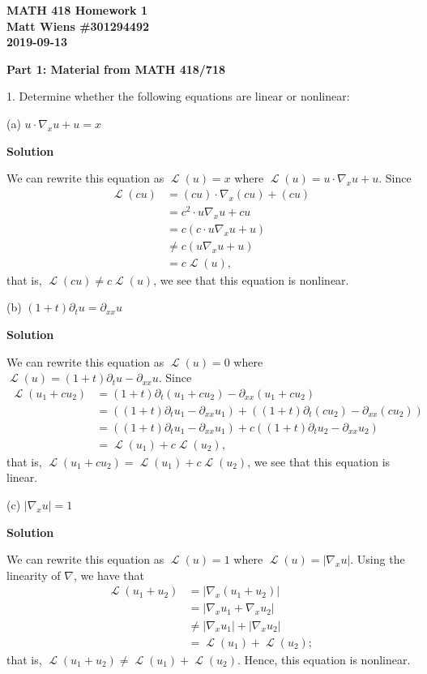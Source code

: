 \documentclass{article}
\DeclareMathOperator{\Lagr}{\mathcal{L}}
\begin{document}
\textbf{MATH 418 Homework 1} \\
\textbf{Matt Wiens \#301294492} \\
\textbf{2019-09-13}

\textbf{Part 1: Material from MATH 418/718}

1. Determine whether the following equations are linear or nonlinear:

(a) $u \cdot \nabla_{x} u + u = x$

\textbf{Solution}

We can rewrite this equation as $\Lagr(u) = x$ where
$\Lagr(u) = u \cdot \nabla_{x} u + u$. Since
%
\begin{align*}
    \Lagr(c u)
        &= (c u) \cdot \nabla_x (c u) + (c u) \\
        &= c^2 \cdot u \nabla_x u + c u \\
        &= c \left(c \cdot u \nabla_x u + u \right) \\
        &\neq c \left(u \nabla_x u + u \right) \\
        &= c \Lagr(u),
\end{align*}
%
that is, $\Lagr(c u) \neq c \Lagr(u)$, we see that this equation is nonlinear.

\vspace{5mm}
(b) $(1 + t) \partial_{t} u = \partial_{x x} u$

\textbf{Solution}

We can rewrite this equation as $\Lagr(u) = 0$ where
$\Lagr(u) = (1 + t) \partial_{t} u - \partial_{x x} u$. Since
%
\begin{align*}
    \Lagr(u_1 + c u_2)
        &= (1 + t) \partial_{t} (u_1 + c u_2) - \partial_{x x} (u_1 + c u_2) \\
        &= \left( (1 + t) \partial_{t} u_1 - \partial_{x x} u_1 \right)
           + \left( (1 + t) \partial_{t} (c u_2) -  \partial_{x x} (c u_2) \right) \\
        &= \left( (1 + t) \partial_{t} u_1 - \partial_{x x} u_1 \right)
           + c \left( (1 + t) \partial_{t} u_2 -  \partial_{x x} u_2 \right) \\
        &= \Lagr(u_1) + c \Lagr(u_2),
\end{align*}
%
that is, $\Lagr(u_1 + c u_2) = \Lagr(u_1) + c \Lagr(u_2)$, we see that
this equation is linear.

\vspace{5mm}
(c) $\left| \nabla_{x} u \right| = 1$

\textbf{Solution}

We can rewrite this equation as $\Lagr(u) = 1$ where
$\Lagr(u) = \left| \nabla_{x} u \right|$. Using the linearity of
$\nabla$, we have that
%
\begin{align*}
    \Lagr(u_1 + u_2)
        &= \left| \nabla_{x} (u_1 + u_2) \right| \\
        &= \left| \nabla_{x} u_1 + \nabla_{x} u_2 \right| \\
        &\neq \left| \nabla_{x} u_1 \right| + \left| \nabla_{x} u_2 \right| \\
        &= \Lagr(u_1) + \Lagr(u_2);
\end{align*}
%
that is, $\Lagr(u_1 + u_2) \neq \Lagr(u_1) + \Lagr(u_2)$. Hence, this
equation is nonlinear.
\end{document}
